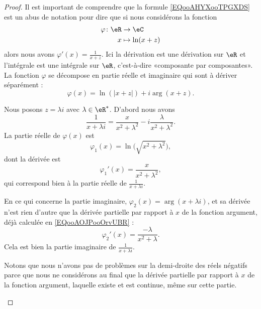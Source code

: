 \begin{proof}
	Il est important de comprendre que la formule \eqref{EQooAHYXooTPGXDS} est un abus de notation pour dire que si nous considérons la fonction
	\begin{equation}
		\begin{aligned}
			\varphi\colon \eR & \to \eC          \\
			x                 & \mapsto \ln(x+z)
		\end{aligned}
	\end{equation}
	alors nous avons \( \varphi'(x)=\frac{1}{ x+z }\). Ici la dérivation est une dérivation sur \( \eR\) et l'intégrale est une intégrale sur \( \eR\), c'est-à-dire «composante par composantes». La fonction \(  \varphi\) se décompose en partie réelle et imaginaire qui sont à dériver séparément :
	\begin{equation}
		\varphi(x)=\ln(| x+z |)+i\arg(x+z).
	\end{equation}

	\begin{subproof}


		Nous posons \( z=\lambda i\) avec \( \lambda\in \eR^*\). D'abord nous avons
		\begin{equation}
			\frac{1}{ x+\lambda i }=\frac{ x }{ x^2+\lambda^2 }-i\frac{ \lambda }{ x^2+\lambda^2 }.
		\end{equation}
		La partie réelle de \( \varphi(x)\) est
		\begin{equation}
			\varphi_1(x)=\ln\big( \sqrt{ x^2+\lambda^2 } \big),
		\end{equation}
		dont la dérivée est
		\begin{equation}
			\varphi_1'(x)=\frac{ x }{ x^2+\lambda^2 },
		\end{equation}
		qui correspond bien à la partie réelle de \( \frac{1}{ x+\lambda i }\).

		En ce qui concerne la partie imaginaire, \( \varphi_2(x)=\arg(x+\lambda i)\), et sa dérivée n'est rien d'autre que la dérivée partielle par rapport à \( x\) de la fonction argument, déjà calculée en \eqref{EQooAOJPooOrvUBR} :
		\begin{equation}
			\varphi_2'(x)=\frac{ -\lambda }{ x^2+\lambda }.
		\end{equation}
		Cela est bien la partie imaginaire de \( \frac{1}{ x+\lambda i }\).

		Notons que nous n'avons pas de problèmes sur la demi-droite des réels négatifs parce que nous ne considérons au final que la dérivée partielle par rapport à \( x\) de la fonction argument, laquelle existe et est continue, même sur cette partie.


\end{subproof}
\end{proof}
